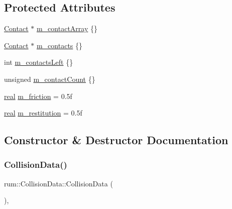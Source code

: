 \subsection*{Protected Attributes}
\begin{DoxyCompactItemize}
\item 
\mbox{\hyperlink{classrum_1_1_contact}{Contact}} $\ast$ \mbox{\hyperlink{classrum_1_1_collision_data_a81c91a3b806491ce9a6c2b458e10cee6}{m\+\_\+contact\+Array}} \{\}
\item 
\mbox{\hyperlink{classrum_1_1_contact}{Contact}} $\ast$ \mbox{\hyperlink{classrum_1_1_collision_data_a4328ce35ae3759b3ca313177bb561ef0}{m\+\_\+contacts}} \{\}
\item 
int \mbox{\hyperlink{classrum_1_1_collision_data_a037132e6e4f65c885f1d29da338df4af}{m\+\_\+contacts\+Left}} \{\}
\item 
unsigned \mbox{\hyperlink{classrum_1_1_collision_data_a17225794f1a582d0d5c5565ffc3334ff}{m\+\_\+contact\+Count}} \{\}
\item 
\mbox{\hyperlink{namespacerum_a7e8cca23573d5eaead0f138cbaa4862c}{real}} \mbox{\hyperlink{classrum_1_1_collision_data_a752a7564c13eeff1a03b6552238f6a00}{m\+\_\+friction}} = 0.\+5f
\item 
\mbox{\hyperlink{namespacerum_a7e8cca23573d5eaead0f138cbaa4862c}{real}} \mbox{\hyperlink{classrum_1_1_collision_data_ab28c985d5b8554f548a485cac367c1fd}{m\+\_\+restitution}} = 0.\+5f
\end{DoxyCompactItemize}


\subsection{Constructor \& Destructor Documentation}
\mbox{\label{classrum_1_1_collision_data_a048dec3ce6286f05820891677d7ea538}} 
\subsubsection{\texorpdfstring{Collision\+Data()}{CollisionData()}}
{\footnotesize\ttfamily rum\+::\+Collision\+Data\+::\+Collision\+Data (\begin{DoxyParamCaption}{ }\end{DoxyParamCaption})\hspace{0.3cm}{\ttfamily [explicit]}, {\ttfamily [default]}}

